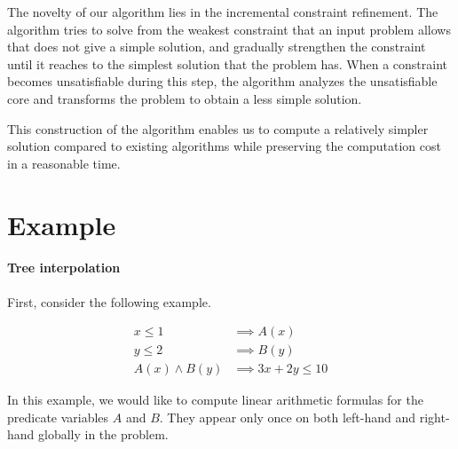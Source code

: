 The novelty of our algorithm lies in the incremental constraint
refinement.  The algorithm tries to solve from the weakest constraint
that an input problem allows that does not give a simple solution, and
gradually strengthen the constraint until it reaches to the simplest
solution that the problem has.  When a constraint becomes
unsatisfiable during this step, the algorithm analyzes the
unsatisfiable core and transforms the problem to obtain a less simple
solution.

This construction of the algorithm enables us to compute a relatively
simpler solution compared to existing algorithms while preserving the
computation cost in a reasonable time.

\section{Example}

\paragraph {Tree interpolation}
First, consider the following example.

\begin{align*}
x \leq 1 & \implies A(x) \\
y \leq 2 & \implies B(y) \\
A(x) \wedge B(y) & \implies 3x+2y \leq 10
\end{align*}

In this example, we would like to compute linear arithmetic formulas
for the predicate variables $A$ and $B$.  They appear only once on
both left-hand and right-hand globally in the problem.

